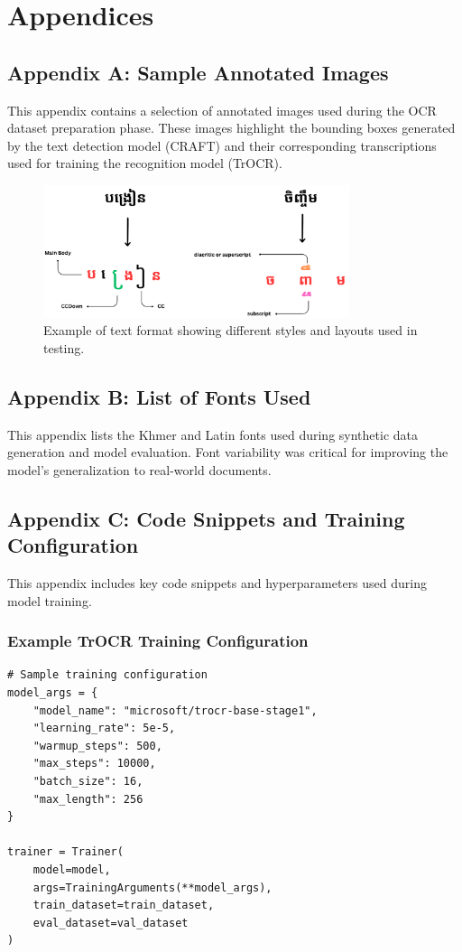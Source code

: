 \appendix
\chapter*{Appendices}

\vspace{0.5cm}
\label{appendix-a}
\section*{Appendix A: Sample Annotated Images}
This appendix contains a selection of annotated images used during the OCR dataset preparation phase. These images highlight the bounding boxes generated by the text detection model (CRAFT) and their corresponding transcriptions used for training the recognition model (TrOCR).

\begin{figure}[h]
    \centering
    \includegraphics[width=0.8\textwidth]{figures/example_of_text_format.png}
    \caption{Example of text format showing different styles and layouts used in testing.}
\end{figure}

\clearpage
{}
\label{appendix-b}
\section*{Appendix B: List of Fonts Used}
This appendix lists the Khmer and Latin fonts used during synthetic data generation and model evaluation. Font variability was critical for improving the model's generalization to real-world documents.

\clearpage
{}
\label{appendix-c}
\section*{Appendix C: Code Snippets and Training Configuration}
This appendix includes key code snippets and hyperparameters used during model training.

\subsection*{Example TrOCR Training Configuration}
\begin{verbatim}
# Sample training configuration
model_args = {
    "model_name": "microsoft/trocr-base-stage1",
    "learning_rate": 5e-5,
    "warmup_steps": 500,
    "max_steps": 10000,
    "batch_size": 16,
    "max_length": 256
}

trainer = Trainer(
    model=model,
    args=TrainingArguments(**model_args),
    train_dataset=train_dataset,
    eval_dataset=val_dataset
)
\end{verbatim}

